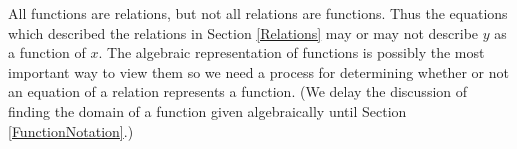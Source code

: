 \medskip

All functions are relations, but not all relations are functions.  Thus the equations which described the relations in Section \ref{Relations} may or may not describe $y$ as a function of $x$.  The algebraic representation of functions is possibly the most important way to view them so we need a process for determining whether or not an equation of a relation represents a function.  (We delay the discussion of finding the domain of a function given algebraically until Section \ref{FunctionNotation}.)



\pagebreak


